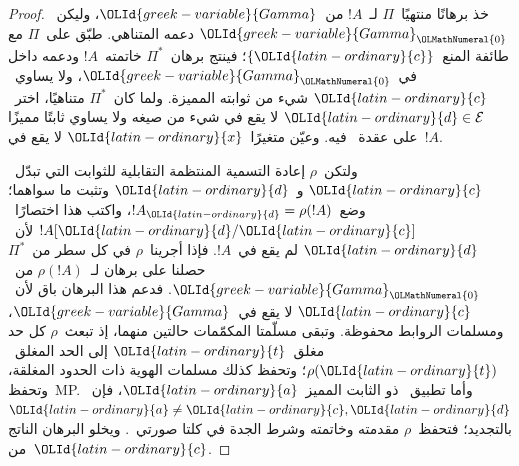 \documentclass[../../../include/open-logic-section]{subfiles}
\begin{document}
\begin{proof}
خذ برهانًا منتهيًا~$\Pi$ لـ~$!A$ من~${\OLId{greek-variable}{Gamma}}$، وليكن~${\OLId{greek-variable}{Gamma}}_{\OLMathNumeral{0}}$
دعمه المتناهي. طبّق  على~$\Pi$ مع طائفة
المنع~$\{{\OLId{latin-ordinary}{c}}\}$؛ فينتج برهان~$\Pi^*$ خاتمته~$!A$ ودعمه داخل
في~${\OLId{greek-variable}{Gamma}}_{\OLMathNumeral{0}}$، ولا يساوي~${\OLId{latin-ordinary}{c}}$ شيء من ثوابته المميزة. ولما كان~$\Pi^*$
متناهيًا، اختر~${\OLId{latin-ordinary}{d}}\in\mathcal E$ لا يقع في شيء من صيغه ولا يساوي ثابتًا
مميزًا على عقدة~\QR{} فيه. وعيّن متغيرًا~${\OLId{latin-ordinary}{x}}$ لا يقع في~$!A$.

ولتكن~$\rho$ إعادة التسمية المنتظمة التقابلية للثوابت التي تبدّل~${\OLId{latin-ordinary}{c}}$ و~${\OLId{latin-ordinary}{d}}$
وتثبت ما سواهما؛ وضع~$!A_{\OLId{latin-ordinary}{d}}=\rho(!A)$، واكتب هذا اختصارًا~$!A[{\OLId{latin-ordinary}{d}}/{\OLId{latin-ordinary}{c}}]$
لأن~${\OLId{latin-ordinary}{d}}$ لم يقع في~$!A$. فإذا أجرينا~$\rho$ في كل سطر
من~$\Pi^*$ حصلنا على برهان لـ~$\rho(!A)$ من~${\OLId{greek-variable}{Gamma}}_{\OLMathNumeral{0}}$. فدعم هذا البرهان باق لأن~${\OLId{latin-ordinary}{c}}$
لا يقع في~${\OLId{greek-variable}{Gamma}}$، ومسلمات الروابط محفوظة. وتبقى مسلّمتا المكمّمات حالتين
منهما، إذ تبعث~$\rho$ كل حد مغلق~${\OLId{latin-ordinary}{t}}$ إلى الحد المغلق~$\rho({\OLId{latin-ordinary}{t}})$؛ وتحفظ
كذلك مسلمات الهوية ذات الحدود المغلقة، وتحفظ~MP. وأما تطبيق~\QR{} ذو
الثابت المميز~${\OLId{latin-ordinary}{a}}$، فإن~${\OLId{latin-ordinary}{a}}\ne {\OLId{latin-ordinary}{c}},{\OLId{latin-ordinary}{d}}$ بالتجديد؛ فتحفظ~$\rho$ مقدمته
وخاتمته وشرط الجدة في كلتا صورتي~\QR{}.
ويخلو البرهان الناتج من~${\OLId{latin-ordinary}{c}}$.


\end{proof}
\end{document}
